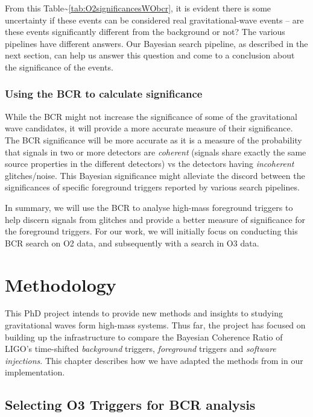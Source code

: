 \documentclass[%
 reprint,
 amsmath,amssymb,
 aps,
]{revtex4-2}
\begin{document}
From this Table\textasciitilde\ref{tab:O2significancesWObcr}, it is evident there is some uncertainty if these events can be considered real
gravitational-wave events -- are these events significantly different from the background or not? The various pipelines
have different answers. Our Bayesian search pipeline, as described in the next section, can help us answer this question
and come to a conclusion about the significance of the events.

\hypertarget{using-the-bcr-to-calculate-significance}{%
\subsection{Using the BCR to calculate significance}\label{using-the-bcr-to-calculate-significance}}

While the BCR might not increase the significance of some of the gravitational wave candidates, it will provide a more
accurate measure of their significance. The BCR significance will be more accurate as it is a measure of the probability
that signals in two or more detectors are \emph{coherent} (signals share exactly the same source properties in the different
detectors) vs the detectors having \emph{incoherent} glitches/noise. This Bayesian significance might alleviate the discord
between the significances of specific foreground triggers reported by various search pipelines.

In summary, we will use the BCR to analyse high-mass foreground triggers to help discern signals from glitches and
provide a better measure of significance for the foreground triggers. For our work, we will initially focus on
conducting this BCR search on O2 data, and subsequently with a search in O3 data.

\hypertarget{methodology}{%
\chapter{Methodology}\label{methodology}}

This PhD project intends to provide new methods and insights to studying gravitational waves form high-mass systems.
Thus far, the project has focused on building up the infrastructure to compare the Bayesian Coherence Ratio of LIGO's
time-shifted \emph{background} triggers, \emph{foreground} triggers and \emph{software injections}. This chapter describes how we have
adapted the methods from \citet{bcr_paper} in our implementation.

\hypertarget{selecting-o3-triggers-for-bcr-analysis}{%
\section{Selecting O3 Triggers for BCR analysis}\label{selecting-o3-triggers-for-bcr-analysis}}
\end{document}
